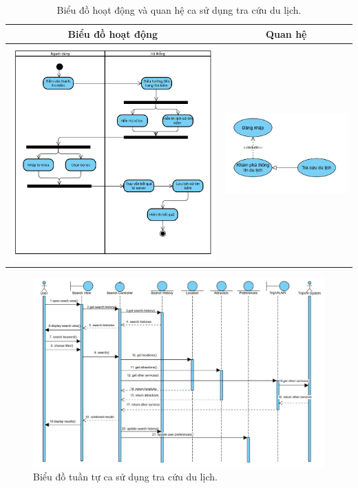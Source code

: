 \begin{table}[H] %
    \centering
    \caption{Biểu đồ hoạt động và quan hệ ca sử dụng tra cứu du lịch.} %
    \label{tab:uc_search_diagrams} %
    \begin{tabular}{| c | c |}
        \hline
        \textbf{Biểu đồ hoạt động} & \textbf{Quan hệ} \\
        \hline
        \includegraphics[width=0.5\linewidth]{figures/c3/3-3-5-ad.png}
        &
        \includegraphics[width=0.45\linewidth]{figures/c3/3-3-5-rd.png} \\
        \hline
    \end{tabular}
\end{table}

\begin{figure}[H]
    \centering
    \includegraphics[width=1\textwidth]{figures/c3/3-3-5-sd.png} %
    \caption{Biểu đồ tuần tự ca sử dụng tra cứu du lịch.}
    \label{fig:3-3-5-sequence-diagram}
\end{figure}